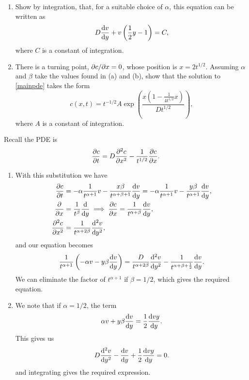 \documentclass[a4paper, 12pt]{article}
\begin{document}
\begin{enumerate}[label={\bf \arabic{*}.\;}, ref={\arabic{*}},itemsep=3ex, left=0ex]
{\begin{enumerate}[label=(\alph*)]
        \item
          Show by integration, that, for a suitable choice of $\alpha$, this equation can be written as
          \begin{equation}
            D\fd{v}{y} + v\left(\frac{1}{2}y-1\right) = C,
          \end{equation}
          where $C$ is a constant of integration.

        \item There is a turning point, $\pd{c}{x}=0$, whose position is $x= 2t^{1/2}$. Assuming $\alpha$ and $\beta$ take the values found in (a) and (b), show that the solution to \cref{mainpde} takes the form
          \begin{equation}
            c(x,t) = t^{-1/2} A\exp\left(\frac{x(1-\frac{1}{4t^{1/2}}x)}{Dt^{1/2}}\right),
          \end{equation}
          where $A$ is a constant of integration.

      \end{enumerate}
    }
    {
      Recall the PDE is
      \begin{equation}
        \label{mainpde}
        \pd{c}{t} = D\pdd{c}{x} - \frac{1}{t^{1/2}}\pd{c}{x}.
      \end{equation}

      \begin{enumerate}[label=(\alph*)]
        \item {With this substitution we have
            \begin{align}
              \pd{c}{t} &= -\alpha\frac{1}{t^{\alpha+1}}v- \frac{x\beta}{t^{\alpha+\beta+1}}\fd{v}{y} =  -\alpha\frac{1}{t^{\alpha+1}}v- \frac{y\beta}{t^{\alpha+1}}\fd{v}{y},\\
              \pd{}{x}&= \frac{1}{t^{\beta}}\fd{}{y} \implies \pd{c}{x} = \frac{1}{t^{\alpha +\beta}}\fd{v}{y},\\
              \pdd{c}{x} &= \frac{1}{t^{\alpha+ 2\beta}}\fdd{v}{y},
            \end{align}
            and our equation becomes
            \begin{equation}
              \frac{1}{t^{\alpha+1}}\left(-\alpha v - y\beta\fd{v}{y}\right) =\frac{D}{t^{\alpha+2\beta}}\fdd{v}{y} - \frac{1}{t^{\alpha+\beta + \frac{1}{2}}}\fd{v}{y}.
            \end{equation}
            We can eliminate the  factor of $t^{\alpha+1}$ if $\beta =1/2$, which gives the required equation.

          }
        \item{
            We note that if $\alpha =1/2$, the term
            \begin{equation}
              \alpha v + y\beta\fd{v}{y} = \frac{1}{2}\fd{v y}{y}.
            \end{equation}
            This gives us
            \begin{equation}
              D\fdd{v}{y} -\fd{v}{y} +\frac{1}{2}\fd{vy}{y}=0.
            \end{equation}
            and integrating gives the required expression.

}
\end{enumerate}}
\end{enumerate}
\end{document}
